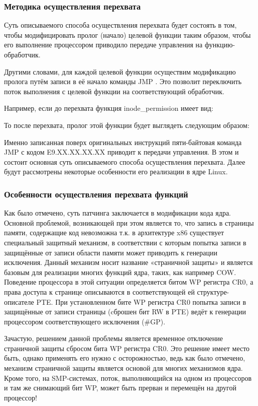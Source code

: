 \subsubsection{Методика осуществления перехвата}
Суть описываемого способа осуществления перехвата будет состоять в том, чтобы модифицировать пролог (начало) целевой функции таким образом, чтобы его выполнение процессором приводило передаче управления на функцию-обработчик.

Другими словами, для каждой целевой функции осуществим модификацию пролога путём записи в её начало команды JMP . Это позволит переключить поток выполнения с целевой функции на соответствующий обработчик.

Например, если до перехвата функция inode\_permission имеет вид:

То после перехвата, пролог этой функции будет выглядеть следующим образом:

Именно записанная поверх оригинальных инструкций пяти-байтовая команда JMP с кодом E9.XX.XX.XX.XX приводит к передачи управления. В этом и состоит основная суть описываемого способа осуществления перехвата. Далее будут рассмотрены некоторые особенности его реализации в ядре Linux.

\subsubsection{Особенности осуществления перехвата функций}
Как было отмечено, суть патчинга заключается в модификации кода ядра. Основной проблемой, возникающей при этом является то, что запись в страницы памяти, содержащие код невозможна т.к. в архитектуре x86 существует специальный защитный механизм, в соответствии с которым попытка записи в защищённые от записи области памяти может приводить к генерации исключения. Данный механизм носит название «страничной защиты» и является базовым для реализации многих функций ядра, таких, как например COW. Поведение процессора в этой ситуации определяется битом WP регистра CR0, а права доступа к странице описываются в соответствующей ей структуре-описателе PTE. При установленном бите WP регистра CR0 попытка записи в защищённые от записи страницы (cброшен бит RW в PTE) ведёт к генерации процессором соответствующего исключения (\#GP).

Зачастую, решением данной проблемы является временное отключение страничной защиты сбросом бита WP регистра CR0. Это решение имеет место быть, однако применять его нужно с осторожностью, ведь как было отмечено, механизм страничной защиты является основой для многих механизмов ядра. Кроме того, на SMP-системах, поток, выполняющийся на одном из процессоров и там же снимающий бит WP, может быть прерван и перемещён на другой процессор!

